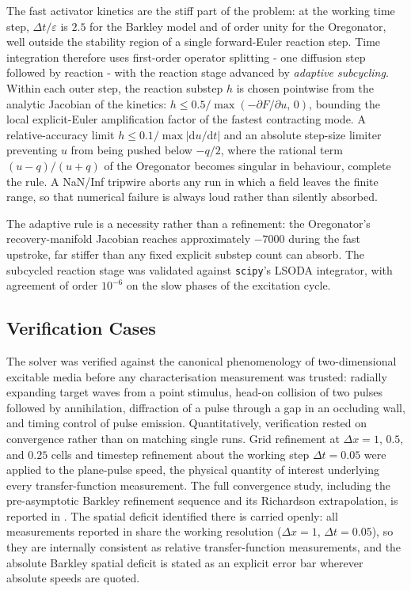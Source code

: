 The fast activator kinetics are the stiff part of the problem: at the working time step, $\Delta t/\varepsilon$ is $2.5$ for the Barkley model and of order unity for the Oregonator, well outside the stability region of a single forward-Euler reaction step.
Time integration therefore uses first-order operator splitting - one diffusion step followed by reaction - with the reaction stage advanced by \emph{adaptive subcycling}.
Within each outer step, the reaction substep $h$ is chosen pointwise from the analytic Jacobian of the kinetics: $h \leq 0.5 / \max(-\partial F/\partial u,\,0)$, bounding the local explicit-Euler amplification factor of the fastest contracting mode. A relative-accuracy limit $h \leq 0.1 / \max|\mathrm{d}u/\mathrm{d}t|$ and an absolute step-size limiter preventing $u$ from being pushed below $-q/2$, where the rational term $(u-q)/(u+q)$ of the Oregonator becomes singular in behaviour, complete the rule.
A NaN/Inf tripwire aborts any run in which a field leaves the finite range, so that numerical failure is always loud rather than silently absorbed.

The adaptive rule is a necessity rather than a refinement: the Oregonator's recovery-manifold Jacobian reaches approximately $-7000$ during the fast upstroke, far stiffer than any fixed explicit substep count can absorb.
The subcycled reaction stage was validated against \texttt{scipy}'s LSODA integrator, with agreement of order $10^{-6}$ on the slow phases of the excitation cycle.

\subsection{Verification Cases}
\label{sec:meth_verification}

The solver was verified against the canonical phenomenology of two-dimensional excitable media before any characterisation measurement was trusted: radially expanding target waves from a point stimulus, head-on collision of two pulses followed by annihilation, diffraction of a pulse through a gap in an occluding wall, and timing control of pulse emission.
Quantitatively, verification rested on convergence rather than on matching single runs.
Grid refinement at $\Delta x = 1$, $0.5$, and $0.25$ cells and timestep refinement about the working step $\Delta t = 0.05$ were applied to the plane-pulse speed, the physical quantity of interest underlying every transfer-function measurement.
The full convergence study, including the pre-asymptotic Barkley refinement sequence and its Richardson extrapolation, is reported in .
The spatial deficit identified there is carried openly: all measurements reported in  share the working resolution ($\Delta x = 1$, $\Delta t = 0.05$), so they are internally consistent as relative transfer-function measurements, and the absolute Barkley spatial deficit is stated as an explicit error bar wherever absolute speeds are quoted.


